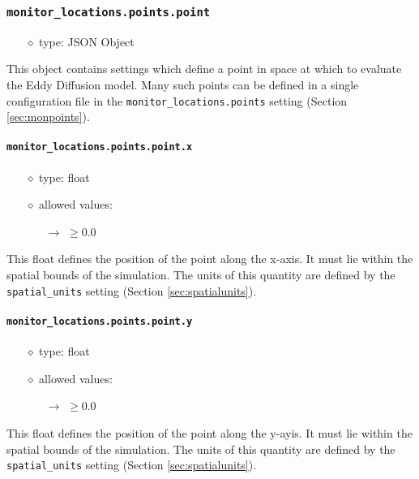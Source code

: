 \documentclass[]{article}
\def\code#1{\texttt{#1}}
\begin{document}
\subsubsection{\code{monitor\_locations.points.point}}
\begin{itemize}
    \item[$\diamond$] type: JSON Object 
\end{itemize}
This object contains settings which define a point in space at which to evaluate
the Eddy Diffusion model. Many such points can be defined in a
single configuration file in the \code{monitor\_locations.points} setting (Section
\ref{sec:monpoints}).

\paragraph{\code{monitor\_locations.points.point.x}}
\begin{itemize}
    \item[$\diamond$] type: float 
    \item[$\diamond$] allowed values:
    \begin{itemize}
        \item[$\rightarrow$] $\geq0.0$
    \end{itemize}
\end{itemize}
This float defines the position of the point along the x-axis. It must lie
within the spatial bounds of the simulation. The units of this quantity are
defined by the \code{spatial\_units} setting (Section \ref{sec:spatialunits}).

\paragraph{\code{monitor\_locations.points.point.y}}
\begin{itemize}
    \item[$\diamond$] type: float 
    \item[$\diamond$] allowed values:
    \begin{itemize}
        \item[$\rightarrow$] $\geq0.0$
    \end{itemize}
\end{itemize}
This float defines the position of the point along the y-ayis. It must lie
within the spatial bounds of the simulation. The units of this quantity are
defined by the \code{spatial\_units} setting (Section \ref{sec:spatialunits}).
\end{document}
